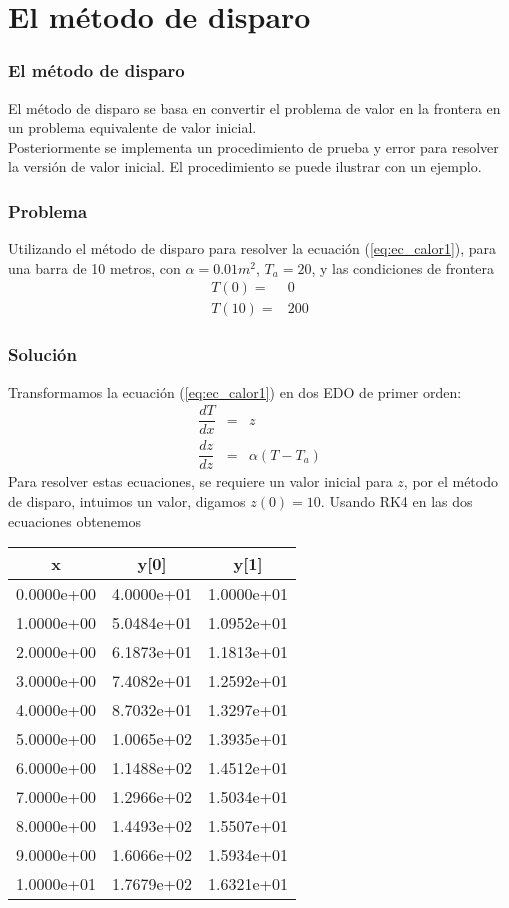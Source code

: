 \section{El m\'{e}todo de disparo}
\begin{frame}
\frametitle{El m\'{e}todo de disparo}
El m\'{e}todo de disparo se basa en convertir el problema de valor en la frontera en un problema equivalente de valor inicial.
\\
\bigskip
Posteriormente se implementa un procedimiento de prueba y error para resolver la versi\'{o}n de valor inicial. El procedimiento se puede ilustrar con un ejemplo.
\end{frame}
\begin{frame}
\frametitle{Problema}
Utilizando el m\'{e}todo de disparo para resolver la ecuaci\'{o}n (\ref{eq:ec_calor1}), para una barra de 10 metros, con $\alpha= 0.01m^{2}$, $T_{a}=20$, y las condiciones de frontera
\[ \begin{split} 
T(0)=& 0 \\
T(10) =& 200 
\end{split} \]
\end{frame}
\begin{frame}
\frametitle{Soluci\'{o}n}
Transformamos la ecuaci\'{o}n (\ref{eq:ec_calor1}) en dos EDO de primer orden:
\begin{eqnarray*}
\dfrac{dT}{dx} &=& z \\
\dfrac{dz}{dz} &=& \alpha (T - T_{a})
\end{eqnarray*}
Para resolver estas ecuaciones, se requiere un valor inicial para $z$, por el m\'{e}todo de disparo, intuimos un valor, digamos $z(0)=10$. Usando RK4 en las dos ecuaciones obtenemos
\end{frame}
\begin{frame}
\fontsize{12}{12}\selectfont
\begin{center}
\begin{tabular}{c | c | c}
 x & y[0] & y[1] \\ \hline
0.0000e+00 & 4.0000e+01 & 1.0000e+01 \\
1.0000e+00 & 5.0484e+01 & 1.0952e+01 \\
2.0000e+00 & 6.1873e+01 & 1.1813e+01 \\
3.0000e+00 & 7.4082e+01 & 1.2592e+01 \\
4.0000e+00 & 8.7032e+01 & 1.3297e+01 \\
5.0000e+00 & 1.0065e+02 & 1.3935e+01 \\
6.0000e+00 & 1.1488e+02 & 1.4512e+01 \\
7.0000e+00 & 1.2966e+02 & 1.5034e+01 \\
8.0000e+00 & 1.4493e+02 & 1.5507e+01 \\
9.0000e+00 & 1.6066e+02 & 1.5934e+01 \\
1.0000e+01 & 1.7679e+02 & 1.6321e+01
\end{tabular}
\end{center}
\end{frame}
